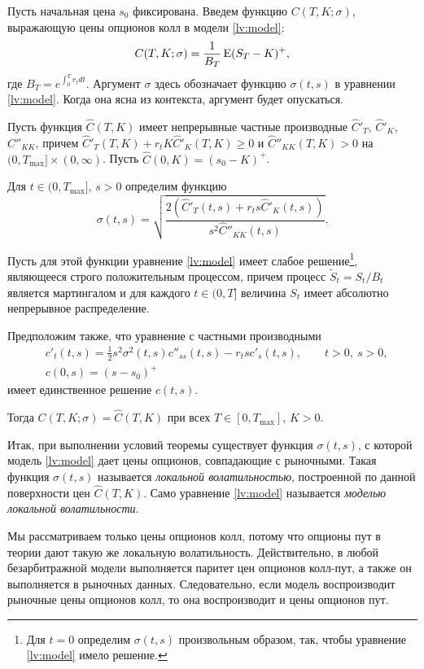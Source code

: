 Пусть начальная цена $s_0$ фиксирована.
Введем функцию $C(T,K; \sigma)$, выражающую цены опционов колл в модели \eqref{lv:model}:
\[
C(T,K; \sigma) = \frac1{B_T}\operatorname{E}(S_T-K)^+,
\]
где $B_T = e^{\int_0^T r_tdt}$.
Аргумент $\sigma$ здесь обозначает функцию $\sigma(t,s)$ в уравнении \eqref{lv:model}.
Когда она ясна из контекста, аргумент будет опускаться.

\begin{theorem}
\label{lv:t:dupire}
Пусть функция $\hat C(T,K)$ имеет непрерывные частные производные $\hat C'_T$, $\hat C'_K$, $\hat C''_{KK}$, причем $\hat C'_T(T,K) + r_t K \hat C'_K(T,K)\ge 0$ и $\hat C''_{KK}(T,K)>0$  на $(0,T_{\max}]\times(0,\infty)$.
Пусть $\hat C(0,K) = (s_0-K)^+$.

Для $t\in(0,T_{\max}]$, $s>0$ определим функцию
\begin{equation}
\label{lv:dupire}
\sigma(t,s) = \sqrt{\frac{2(\hat C'_T(t,s) + r_ts\hat C'_K(t,s))}{s^2\hat C''_{KK}(t,s)}}.
\end{equation}

Пусть для этой функции уравнение \eqref{lv:model} имеет слабое решение\footnote{Для $t=0$ определим $\sigma(t,s)$ произвольным образом, так, чтобы уравнение \eqref{lv:model} имело решение.}, являющееся строго положительным процессом, причем процесс $\tilde S_t = S_t/B_t$ является мартингалом и для каждого $t\in(0,T]$ величина $S_t$ имеет абсолютно непрерывное распределение.

Предположим также, что уравнение с частными производными
\begin{align}
\label{lv:pde}
&c'_t(t,s) = \frac12 s^2 \sigma^2(t,s) c''_{ss}(t,s) - r_tsc'_s(t,s), \qquad t>0,\ s>0,\\
&c(0,s) = (s-s_0)^+
\label{lv:pde-boundary}
\end{align}
имеет единственное решение $c(t,s)$.

Тогда $C(T,K; \sigma) = \hat C(T,K)$ при всех $T\in[0,T_{\max}]$, $K>0$.
\end{theorem}

Итак, при выполнении условий теоремы существует функция $\sigma(t,s)$, с которой модель \eqref{lv:model} дает цены опционов, совпадающие с рыночными.
Такая функция $\sigma(t,s)$ называется \emph{локальной волатильностью}, построенной по данной поверхности цен $\hat C(T,K)$.
Само уравнение \eqref{lv:model} называется \emph{моделью локальной волатильности}.

\begin{remark}
Мы рассматриваем только цены опционов колл, потому что опционы пут в теории дают такую же локальную волатильность.
Действительно, в любой безарбитражной модели выполняется паритет цен опционов колл-пут, а также он выполняется в рыночных данных.
Следовательно, если модель воспроизводит рыночные цены опционов колл, то она воспроизводит и цены опционов пут.
\end{remark}

